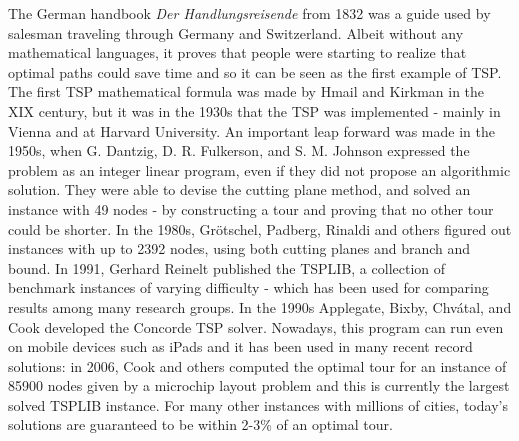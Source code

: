 The German handbook \textit{Der Handlungsreisende} from 1832 was a guide
used by salesman traveling through Germany and Switzerland. Albeit
without any mathematical languages, it proves that people were starting to realize that optimal paths could save time and so it can be seen as the first example of TSP.
The first TSP mathematical formula was made by Hmail and Kirkman in the XIX century, but it was in the 1930s that the TSP was implemented -
mainly in Vienna and at Harvard University. An important leap forward
was made in the 1950s, when G. Dantzig, D. R. Fulkerson, and S. M.
Johnson expressed the problem as an integer linear program, even if they  did not propose an algorithmic solution. They were able to devise the cutting plane method, and solved an instance with 49 nodes - by constructing a tour and proving that no other tour could be shorter.
In the 1980s, Grötschel, Padberg, Rinaldi and others figured out instances with up to 2392 nodes, using both cutting planes and branch and bound. In 1991, Gerhard Reinelt published the TSPLIB, a collection of benchmark instances of varying difficulty - which has been used for comparing results among many research groups. In the 1990s Applegate, Bixby, Chvátal, and Cook developed the Concorde TSP solver. Nowadays, this program can run even on mobile devices such as iPads and it has been used in many recent record solutions: in 2006, Cook and others computed the optimal tour for an instance of 85900 nodes given by a microchip layout problem and this is currently the largest solved TSPLIB instance. For many other instances with millions of cities, today’s solutions are guaranteed to be within 2-3\% of an optimal tour.